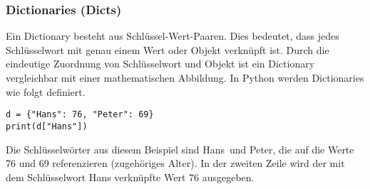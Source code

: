 \subsubsection{Dictionaries (Dicts)}
Ein Dictionary besteht aus Schlüssel-Wert-Paaren. Dies bedeutet, dass jedes Schlüsselwort mit genau einem Wert oder Objekt verknüpft ist. Durch die eindeutige Zuordnung von Schlüsselwort und Objekt ist ein Dictionary vergleichbar mit einer mathematischen Abbildung. In Python werden Dictionaries wie folgt definiert.
\begin{lstlisting}
d = {"Hans": 76, "Peter": 69}
print(d["Hans"])
\end{lstlisting}
Die Schlüsselwörter aus diesem Beispiel sind \glqq Hans\grqq \ und \glqq Peter\grqq , die auf die Werte 76 und 69 referenzieren (zugehöriges Alter). In der zweiten Zeile wird der mit dem Schlüsselwort \glqq Hans\grqq{} verknüpfte Wert 76 ausgegeben.


